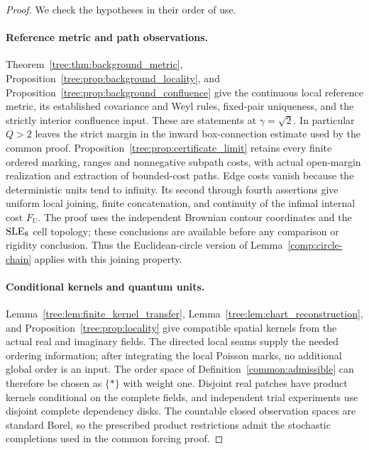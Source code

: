 \begin{proof}
We check the hypotheses in their order of use.

\paragraph{Reference metric and path observations.}
Theorem~\ref{tree:thm:background_metric}, Proposition~\ref{tree:prop:background_locality},
and Proposition~\ref{tree:prop:background_confluence} give the continuous
local reference metric, its established covariance and Weyl rules,
fixed-pair uniqueness, and the strictly interior confluence input.
These are statements at $\gamma=\sqrt2$. In particular $Q>2$ leaves
the strict margin in the inward box-connection estimate used by the
common proof.
Proposition~\ref{tree:prop:certificate_limit} retains every finite
ordered marking, ranges and nonnegative subpath costs, with actual
open-margin realization and extraction of bounded-cost paths. Edge
costs vanish because the deterministic units tend to infinity.
Its second through fourth assertions give uniform local joining,
finite concatenation, and continuity of the infimal internal cost
$F_U$. The proof uses the independent Brownian contour coordinates and the
$\mathrm{SLE}_8$ cell topology; these conclusions are available before any
comparison or rigidity conclusion. Thus the Euclidean-circle version
of Lemma~\ref{comp:circle-chain} applies with this joining property.

\paragraph{Conditional kernels and quantum units.}
Lemma~\ref{tree:lem:finite_kernel_transfer},
Lemma~\ref{tree:lem:chart_reconstruction}, and
Proposition~\ref{tree:prop:locality} give compatible spatial kernels
from the actual real and imaginary fields. The directed local seams
supply the needed ordering information; after integrating the local
Poisson marks, no additional global order is an input. The order
space of Definition~\ref{common:admissible} can therefore be chosen
as $\{*\}$ with weight one. Disjoint real patches have product
kernels conditional on the complete fields, and independent trial
experiments use disjoint complete dependency disks. The countable
closed observation spaces are standard Borel, so the prescribed
product restrictions admit the stochastic completions used in the
common forcing proof.


\end{proof}
